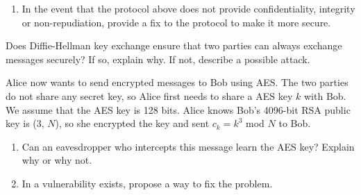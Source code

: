 \begin{enumerate}
    \item In the event that the protocol above does not provide
      confidentiality, integrity or 
      non-repudiation, provide a fix to the protocol to make
      it more secure. \\ 


\end{enumerate}
\eprob

\newpage
{} Does Diffie-Hellman key exchange ensure that two
parties can always exchange messages securely? If so, explain why. If
not, describe a possible attack. \eprob
\vspace*{0.5in}


 Alice now wants to send encrypted messages to Bob using AES.
The two parties do not share any secret key, so Alice first needs to 
share a AES key $k$ with Bob. We assume that the AES key is 128 bits. Alice
knows Bob's 4096-bit RSA public key is (3, $N$), so she encrypted the key and
sent $c_k = k^3$ mod $N$ to Bob. 

\begin {enumerate} 
\item Can an eavesdropper who intercepts this message learn
the AES key? Explain why or why not.  
\item In a vulnerability exists, propose a way to fix the problem.
\end{enumerate}
\eprob
\vspace*{1.5in}

